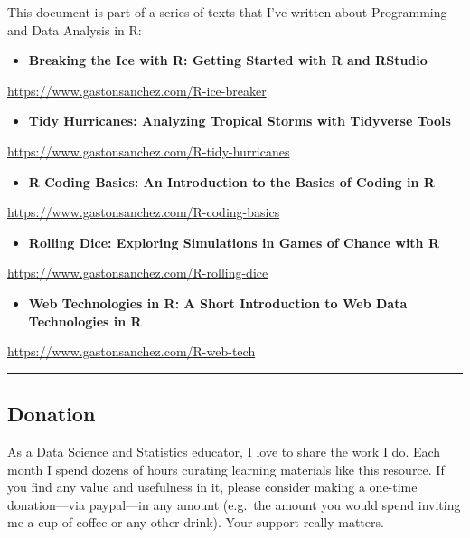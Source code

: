 \documentclass[
]{book}
\providecommand{\tightlist}{%
  \setlength{\itemsep}{0pt}\setlength{\parskip}{0pt}}
\begin{document}
This document is part of a series of texts that I've written about Programming
and Data Analysis in R:

\begin{itemize}
\tightlist
\item
  \textbf{Breaking the Ice with R: Getting Started with R and RStudio}
\end{itemize}

\url{https://www.gastonsanchez.com/R-ice-breaker}

\begin{itemize}
\tightlist
\item
  \textbf{Tidy Hurricanes: Analyzing Tropical Storms with Tidyverse Tools}
\end{itemize}

\url{https://www.gastonsanchez.com/R-tidy-hurricanes}

\begin{itemize}
\tightlist
\item
  \textbf{R Coding Basics: An Introduction to the Basics of Coding in R}
\end{itemize}

\url{https://www.gastonsanchez.com/R-coding-basics}

\begin{itemize}
\tightlist
\item
  \textbf{Rolling Dice: Exploring Simulations in Games of Chance with R}
\end{itemize}

\url{https://www.gastonsanchez.com/R-rolling-dice}

\begin{itemize}
\tightlist
\item
  \textbf{Web Technologies in R: A Short Introduction to Web Data Technologies in R}
\end{itemize}

\url{https://www.gastonsanchez.com/R-web-tech}

\begin{center}\rule{0.5\linewidth}{0.5pt}\end{center}

\hypertarget{donation}{%
\subsection*{Donation}\label{donation}}

As a Data Science and Statistics educator, I love to share the work I do.
Each month I spend dozens of hours curating learning materials like this resource.
If you find any value and usefulness in it, please consider making
a one-time donation---via paypal---in any amount (e.g.~the amount you would spend inviting me a cup of coffee or any other drink). Your support really matters.
\end{document}
